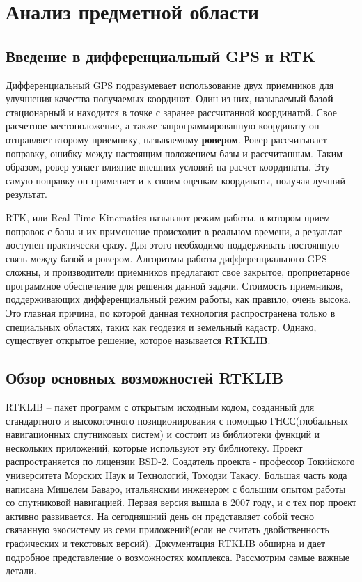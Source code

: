 \chapter{Анализ предметной области} \label{chapt1}

\section{Введение в дифференциальный GPS и RTK} \label{sect1_1}

Дифференциальный GPS подразумевает использование двух приемников для улучшения качества получаемых координат. Один из них, называемый \textbf{базой} - стационарный и находится в точке с заранее рассчитанной координатой. Свое расчетное местоположение, а также запрограммированную координату он отправляет второму приемнику, называемому \textbf{ровером}. Ровер рассчитывает поправку, ошибку между настоящим положением базы и рассчитанным. Таким образом, ровер узнает влияние внешних условий на расчет координаты. Эту самую поправку он применяет и к своим оценкам координаты, получая лучший результат.

RTK, или Real-Time Kinematics называют режим работы, в котором прием поправок с базы и их применение происходит в реальном времени, а результат доступен практически сразу. Для этого необходимо поддерживать постоянную связь между базой и ровером. Алгоритмы работы дифференциального GPS сложны, и производители приемников предлагают свое закрытое, проприетарное программное обеспечение для решения данной задачи. Стоимость приемников, поддерживающих дифференциальный режим работы, как правило, очень высока. Это главная причина, по которой данная технология распространена только в специальных областях, таких как геодезия и земельный кадастр. Однако, существует открытое решение, которое называется \textbf{RTKLIB}.

\section{Обзор основных возможностей RTKLIB} \label{sect1_2}

RTKLIB – пакет программ с открытым исходным кодом, созданный для стандартного и высокоточного позиционирования с помощью ГНСС(глобальных навигационных спутниковых систем) и состоит из библиотеки функций и нескольких приложений, которые используют эту библиотеку. Проект распространяется по лицензии BSD-2. Создатель проекта -  профессор Токийского университета Морских Наук и Технологий, Томодзи Такасу. Большая часть кода написана Мишелем Баваро, итальянским инженером с большим опытом работы со спутниковой навигацией. Первая версия вышла в 2007 году, и с тех пор проект активно развивается. На сегодняшний день он представляет собой тесно связанную экосистему из семи приложений(если не считать двойственность графических и текстовых версий). Документация RTKLIB \cite{rtklib-docs} обширна и дает подробное представление о возможностях комплекса. Рассмотрим самые важные детали.

